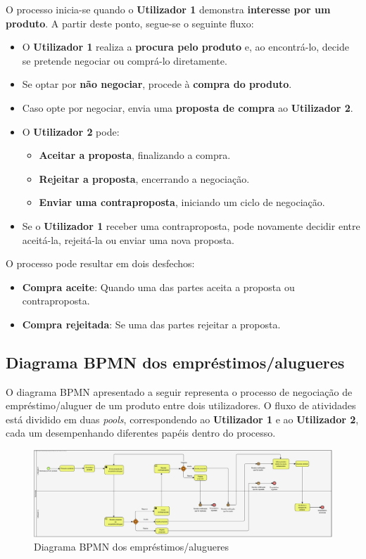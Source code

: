 \documentclass[a4paper, 12pt]{article} %
\begin{document}
O processo inicia-se quando o \textbf{Utilizador 1} demonstra \textbf{interesse por um produto}. A partir deste ponto, segue-se o seguinte fluxo:

\begin{itemize}
	\item O \textbf{Utilizador 1} realiza a \textbf{procura pelo produto} e, ao encontrá-lo, decide se pretende negociar ou comprá-lo diretamente.
	\item Se optar por \textbf{não negociar}, procede à \textbf{compra do produto}.
	\item Caso opte por negociar, envia uma \textbf{proposta de compra} ao \textbf{Utilizador 2}.
	\item O \textbf{Utilizador 2} pode:
	\begin{itemize}
		\item \textbf{Aceitar a proposta}, finalizando a compra.
		\item \textbf{Rejeitar a proposta}, encerrando a negociação.
		\item \textbf{Enviar uma contraproposta}, iniciando um ciclo de negociação.
	\end{itemize}
	\item Se o \textbf{Utilizador 1} receber uma contraproposta, pode novamente decidir entre aceitá-la, rejeitá-la ou enviar uma nova proposta.
\end{itemize}


O processo pode resultar em dois desfechos:
\begin{itemize}
	\item \textbf{Compra aceite}: Quando uma das partes aceita a proposta ou contraproposta.
	\item \textbf{Compra rejeitada}: Se uma das partes rejeitar a proposta.
\end{itemize}

\subsection{Diagrama BPMN dos empréstimos/alugueres}

O diagrama BPMN apresentado a seguir representa o processo de negociação de empréstimo/aluguer de um produto entre dois utilizadores. O fluxo de atividades está dividido em duas \textit{pools}, correspondendo ao \textbf{Utilizador 1} e ao \textbf{Utilizador 2}, cada um desempenhando diferentes papéis dentro do processo. 

\begin{figure}[ht]
	\centering
	\includegraphics[width=\textwidth]{../images/bpmn-rentals.png}
	\caption{Diagrama BPMN dos empréstimos/alugueres}
	\label{fig:bpmn emprestimo/aluguer}
\end{figure}
\end{document}
